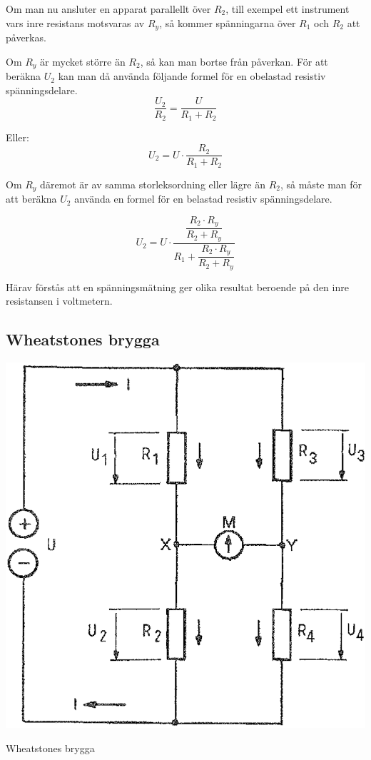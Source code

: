 Om man nu ansluter en apparat parallellt över \(R_2\), till exempel ett instrument
vars inre resistans motsvaras av \(R_y\), så kommer spänningarna över \(R_1\)
och \(R_2\) att påverkas.

Om \(R_y\) är mycket större än \(R_2\), så kan man bortse från påverkan.
För att beräkna \(U_2\) kan man då använda följande formel för en obelastad
resistiv spänningsdelare.
\[  \frac{U_2}{R_2} = \frac{U}{R_1 + R_2} \]

Eller:
\[  U_2 = U \cdot \frac{R_2}{R_1 + R_2} \]

Om \(R_y\) däremot är av samma storleksordning eller lägre än \(R_2\), så måste
man för att beräkna \(U_2\) använda en formel för en belastad resistiv
spänningsdelare.

\[
U_2 = U \cdot \dfrac{ \dfrac{R_2 \cdot R_y}{R_2 + R_y} }{ R_1 + \dfrac{R_2 \cdot R_y}{R_2 + R_y} }
\]

Härav förstås att en spänningsmätning ger olika resultat beroende på den
inre resistansen i voltmetern.

\subsection{Wheatstones brygga}

\begin{marginfigure}%
  \includegraphics[width=\textwidth]{images/cropped_pdfs/bild_2_3-04.pdf}
  \caption{Wheatstones brygga}
  \label{fig:BildII3-04}
\end{marginfigure}

